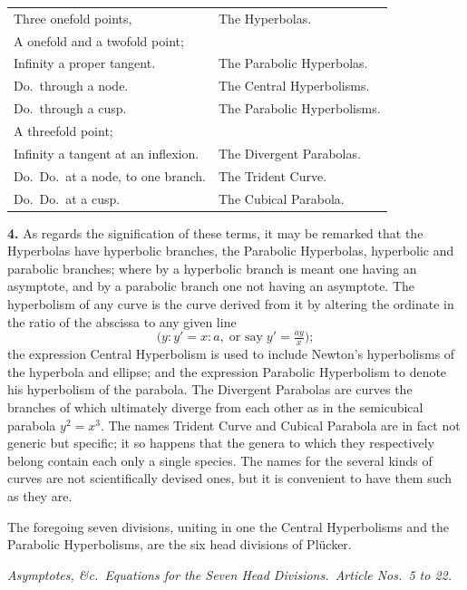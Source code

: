 \documentclass[11pt,a4paper]{article}
\begin{document}
\noindent\begin{tabular}{ll}
Three onefold points, & The Hyperbolas.\\
A onefold and a twofold point; & \\
\quad Infinity a proper tangent. & The Parabolic Hyperbolas.\\
\quad Do.\ through a node. & The Central Hyperbolisms.\\
\quad Do.\ through a cusp. & The Parabolic Hyperbolisms.\\
A threefold point; & \\
\quad Infinity a tangent at an inflexion. & The Divergent Parabolas.\\
\quad Do.\ Do.\ at a node, to one branch. & The Trident Curve.\\
\quad Do.\ Do.\ at a cusp. & The Cubical Parabola.\\
\end{tabular}

\medskip

\textbf{4.} As regards the signification of these terms, it may be remarked that the Hyperbolas have hyperbolic branches, the Parabolic Hyperbolas, hyperbolic and parabolic branches; where by a hyperbolic branch is meant one having an asymptote, and by a parabolic branch one not having an asymptote. The hyperbolism of any curve is the curve derived from it by altering the ordinate in the ratio of the abscissa to any given line
\[
\bigl(y:y'=x:a,\;\text{or say}\;y'=\tfrac{ay}{x}\bigr);
\]
the expression Central Hyperbolism is used to include Newton's hyperbolisms of the hyperbola and ellipse; and the expression Parabolic Hyperbolism to denote his hyperbolism of the parabola. The Divergent Parabolas are curves the branches of which ultimately diverge from each other as in the semicubical parabola $y^{2}=x^{3}$. The names Trident Curve and Cubical Parabola are in fact not generic but specific; it so happens that the genera to which they respectively belong contain each only a single species. The names for the several kinds of curves are not scientifically devised ones, but it is convenient to have them such as they are.

The foregoing seven divisions, uniting in one the Central Hyperbolisms and the Parabolic Hyperbolisms, are the six head divisions of Pl\"ucker.

\medskip

\noindent\textit{Asymptotes, \&c.\ Equations for the Seven Head Divisions.\ Article Nos.\ 5 to 22.}

\medskip
\end{document}

